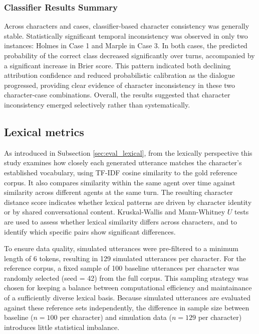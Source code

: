 \documentclass{article}
\begin{document}
\subsubsection{Classifier Results Summary} \label{sec:results_classifier_summary}

Across characters and cases, classifier-based character consistency was generally stable. Statistically significant temporal inconsistency was observed in only two instances: Holmes in Case 1 and Marple in Case 3. In both cases, the predicted probability of the correct class decreased significantly over turns, accompanied by a significant increase in Brier score. This pattern indicated both declining attribution confidence and reduced probabilistic calibration as the dialogue progressed, providing clear evidence of character inconsistency in these two character-case combinations. Overall, the results suggested that character inconsistency emerged selectively rather than systematically.

\subsection{Lexical metrics} \label{sec:results_lexical}

As introduced in Subsection \ref{sec:eval_lexical}, from the lexically perspective this study examines how closely each generated utterance matches the character's established vocabulary, using TF-IDF cosine similarity to the gold reference corpus. It also compares similarity within the same agent over time against similarity across different agents at the same turn. The resulting character distance score indicates whether lexical patterns are driven by character identity or by shared conversational content. Kruskal-Wallis and Mann-Whitney $U$ tests are used to assess whether lexical similarity differs across characters, and to identify which specific pairs show significant differences.

To ensure data quality, simulated utterances were pre-filtered to a minimum length of 6 tokens, resulting in 129 simulated utterances per character. For the reference corpus, a fixed sample of 100 baseline utterances per character was randomly selected (seed = 42) from the full corpus. This sampling strategy was chosen for keeping a balance between computational efficiency and maintainance of a sufficiently diverse lexical basis. Because simulated utterances are evaluated against these reference sets independently, the difference in sample size between baseline ($n=100$ per character) and simulation data ($n=129$ per character) introduces little statistical imbalance.
\end{document}
